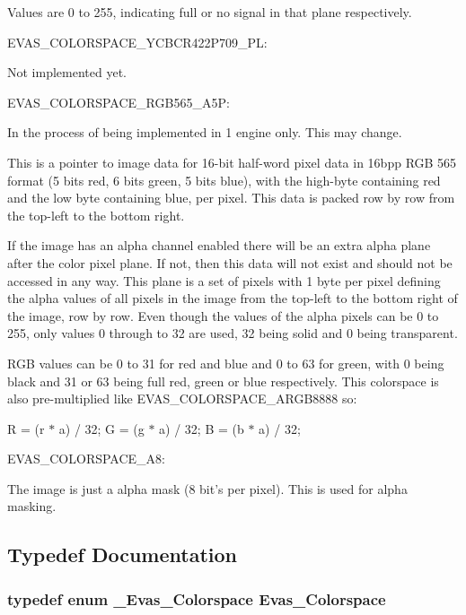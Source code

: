 Values are 0 to 255, indicating full or no signal in that plane respectively.

EVAS\_\-COLORSPACE\_\-YCBCR422P709\_\-PL:

Not implemented yet.

EVAS\_\-COLORSPACE\_\-RGB565\_\-A5P:

In the process of being implemented in 1 engine only. This may change.

This is a pointer to image data for 16-\/bit half-\/word pixel data in 16bpp RGB 565 format (5 bits red, 6 bits green, 5 bits blue), with the high-\/byte containing red and the low byte containing blue, per pixel. This data is packed row by row from the top-\/left to the bottom right.

If the image has an alpha channel enabled there will be an extra alpha plane after the color pixel plane. If not, then this data will not exist and should not be accessed in any way. This plane is a set of pixels with 1 byte per pixel defining the alpha values of all pixels in the image from the top-\/left to the bottom right of the image, row by row. Even though the values of the alpha pixels can be 0 to 255, only values 0 through to 32 are used, 32 being solid and 0 being transparent.

RGB values can be 0 to 31 for red and blue and 0 to 63 for green, with 0 being black and 31 or 63 being full red, green or blue respectively. This colorspace is also pre-\/multiplied like EVAS\_\-COLORSPACE\_\-ARGB8888 so:

R = (r $\ast$ a) / 32; G = (g $\ast$ a) / 32; B = (b $\ast$ a) / 32;

EVAS\_\-COLORSPACE\_\-A8:

The image is just a alpha mask (8 bit's per pixel). This is used for alpha masking. 

\subsection{Typedef Documentation}
\subsubsection[{Evas\_\-Colorspace}]{\setlength{\rightskip}{0pt plus 5cm}typedef enum {\bf \_\-Evas\_\-Colorspace}  {\bf Evas\_\-Colorspace}}\label{group__Evas__Object__Image_ga8c6e60db9c8b83b155ccea52957ff656}


